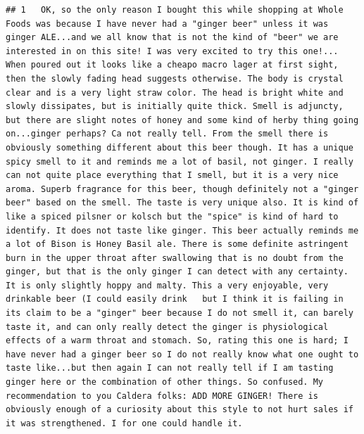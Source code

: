 \documentclass[
  a4paper,
]{article}
\begin{document}
\begin{verbatim}
## 1   OK, so the only reason I bought this while shopping at Whole Foods was because I have never had a "ginger beer" unless it was ginger ALE...and we all know that is not the kind of "beer" we are interested in on this site! I was very excited to try this one!... When poured out it looks like a cheapo macro lager at first sight, then the slowly fading head suggests otherwise. The body is crystal clear and is a very light straw color. The head is bright white and slowly dissipates, but is initially quite thick. Smell is adjuncty, but there are slight notes of honey and some kind of herby thing going on...ginger perhaps? Ca not really tell. From the smell there is obviously something different about this beer though. It has a unique spicy smell to it and reminds me a lot of basil, not ginger. I really can not quite place everything that I smell, but it is a very nice aroma. Superb fragrance for this beer, though definitely not a "ginger beer" based on the smell. The taste is very unique also. It is kind of like a spiced pilsner or kolsch but the "spice" is kind of hard to identify. It does not taste like ginger. This beer actually reminds me a lot of Bison is Honey Basil ale. There is some definite astringent burn in the upper throat after swallowing that is no doubt from the ginger, but that is the only ginger I can detect with any certainty. It is only slightly hoppy and malty. This a very enjoyable, very drinkable beer (I could easily drink   but I think it is failing in its claim to be a "ginger" beer because I do not smell it, can barely taste it, and can only really detect the ginger is physiological effects of a warm throat and stomach. So, rating this one is hard; I have never had a ginger beer so I do not really know what one ought to taste like...but then again I can not really tell if I am tasting ginger here or the combination of other things. So confused. My recommendation to you Caldera folks: ADD MORE GINGER! There is obviously enough of a curiosity about this style to not hurt sales if it was strengthened. I for one could handle it.

\end{verbatim}
\end{document}

